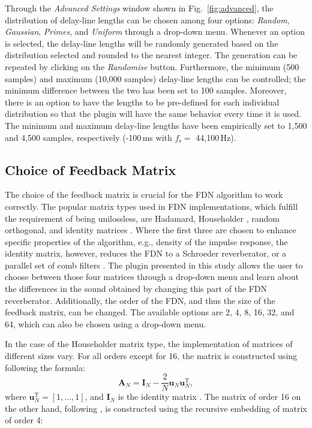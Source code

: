 \documentclass[twoside,a4paper]{article}
\newcommand{\silvin}[1]{\textcolor{ForestGreen}{#1}}
\begin{document}
Through the \textit{Advanced Settings} window shown in Fig.~\ref{fig:advanced}, the distribution of delay-line lengths can be chosen among four options: \textit{Random}, \textit{Gaussian}, \textit{Primes}, and \textit{Uniform} through a drop-down menu. Whenever an option is selected, the delay-line lengths will be randomly generated based on the distribution selected and rounded to the nearest integer. The generation can be repeated by clicking on the \textit{Randomise} button. Furthermore, the minimum (500 samples) and maximum (10,000 samples) delay-line lengths can be controlled; the minimum difference between the two has been set to 100 samples. 
Moreover, there is an option to have the lengths to be pre-defined for each individual distribution so that the plugin will have the same behavior every time it is used. The minimum and maximum delay-line lengths have been empirically set to 1,500 and 4,500 samples, respectively (-100\,ms with $f_\text{s} =$  44,100\,Hz).


\subsection{Choice of Feedback Matrix}

The choice of the feedback matrix is crucial for the FDN algorithm to work correctly. The popular matrix types used in FDN implementations, which fulfill the requirement of being unilossless, are Hadamard, Householder \cite{Jot:1997:icm}, random orthogonal, and identity matrices \cite{menzer2010unitary}. Where the first three are chosen to enhance specific properties of the algorithm, e.g., density of the impulse response, the identity matrix, however, reduces the FDN to a Schroeder reverberator, or a parallel set of comb filters \cite{Jot:Chaine:1991:aes, menzer2010unitary}. The plugin presented in this study allows the user to choose between those four matrices through a drop-down menu and learn about the differences in the sound obtained by changing this part of the FDN reverberator. 
%
Additionally, the order of the FDN, and thus the size of the feedback matrix, can be changed. The available options are 2, 4, 8, 16, 32, and 64, which can also be chosen using a drop-down menu. %

In the case of the Householder matrix type, the implementation of matrices of different sizes vary. For all orders except for 16, the matrix is constructed using following the formula:
\begin{equation}
\mathbf{A}_N = \mathbf{I}_N - \frac{2}{N} \mathbf{u}_N\mathbf{u}_N^\textrm{T},
\label{eq:house}
\end{equation}
where $\mathbf{u}_N^\textrm{T} = [1,\hdots, 1]$, and $\mathbf{I}_N$ is the identity matrix \cite{Jot:1997:icm}. The matrix of order 16 on the other hand, following \cite{PASPWEB2010}, is constructed using the recursive embedding of matrix of order 4:
\end{document}
